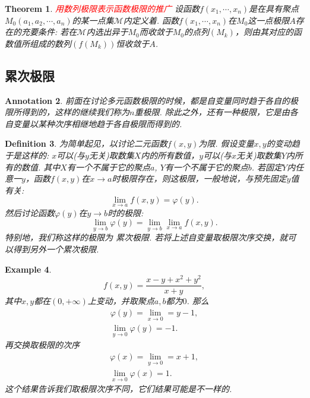 \documentclass{article}
\newtheorem{theorem}{Theorem}[section]
\newtheorem{example}[theorem]{Example}
\newtheorem{definition}[theorem]{Definition}
\newtheorem{annotation}[theorem]{Annotation}
\newcommand{\redt}[1]{\textcolor{red}{#1}}
\begin{document}
\begin{theorem}
\rm \redt{用数列极限表示函数极限的推广} 设函数$f(x_1,\cdots,x_n)$是在具有聚点$M_0(a_1,a_2,\cdots,a_n)$的某一点集$\mathcal{M}$内定义着. 函数$f(x_1,\cdots,x_n)$在$M_0$这一点极限$A$存在的充要条件: 若在$\mathcal{M}$内选出异于$M_0$而收敛于$M_0$的点列$(M_k)$，则由其对应的函数值所组成的数列$(f(M_k))$恒收敛于$A$. 
\end{theorem}

\subsection{累次极限}

\begin{annotation}
\rm 前面在讨论多元函数极限的时候，都是自变量同时趋于各自的极限所得到的，这样的继续我们称为{\color{red}$n$重极限}. 除此之外，还有一种极限，它是由各自变量以某种次序相继地趋于各自极限而得到的.
\end{annotation}

\begin{definition}
\rm 为简单起见，以讨论二元函数$f(x,y)$为限. 假设变量$x,y$的变动趋于是这样的: $x$可以(与$y$无关)取数集$X$内的所有数值，$y$可以(与$x$无关)取数集$Y$内所有的数值. 其中$X$有一个不属于它的聚点$a$, $Y$有一个不属于它的聚点$b$. 若固定$Y$内任意一$y$，函数$f(x,y)$在$x \rightarrow a$时极限存在，则这极限，一般地说，与预先固定$y$值有关:
$$
\lim\limits_{x \rightarrow a} f(x,y) = \varphi(y).
$$
然后讨论函数$\varphi(y)$在$y \rightarrow b$时的极限:
$$
\lim\limits_{y \rightarrow b} \varphi(y) = \lim\limits_{y \rightarrow b}\lim\limits_{x \rightarrow a} f(x,y).
$$
特别地，我们称这样的极限为{\color{red} 累次极限}. 若将上述自变量取极限次序交换，就可以得到另外一个累次极限.
\end{definition}

\begin{example}
\rm $$
	f(x,y) = \frac{x-y + x^2 + y^2}{x + y},
$$
其中$x,y$都在$(0,+\infty)$上变动，并取聚点$a,b$都为$0$. 那么
$$
\begin{array}{l}
\varphi(y) = \lim\limits_{x \rightarrow 0} = y -1, \\
\lim\limits_{y \rightarrow 0} \varphi(y) = -1.
\end{array}
$$
再交换取极限的次序
$$
\begin{array}{l}
\varphi(x) = \lim\limits_{y \rightarrow 0} = x+1, \\
\lim\limits_{x \rightarrow 0} \varphi(x) = 1.
\end{array}
$$
{\color{red} 这个结果告诉我们取极限次序不同，它们结果可能是不一样的}.
\end{example}
\end{document}

